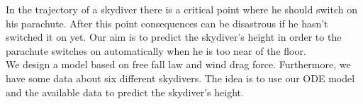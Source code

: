 In the trajectory of a skydiver there is a critical point where he should switch on his parachute. After this point consequences can be disastrous if he hasn't switched it on yet. Our aim is to predict the skydiver's height in order to the parachute switches on automatically when he is too near of the floor.\\
We design a model based on free fall law and wind drag force. Furthermore, we have some data about six different skydivers. The idea is to use our ODE model and the available data to predict the skydiver's height. 